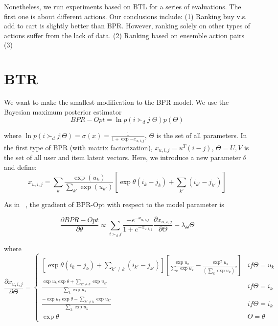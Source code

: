 \documentclass[11pt]{report}
\begin{document}
Nonetheless, we run experiments based on BTL for a series of evaluations. The first one is about different actions. Our conclusions include: (1) Ranking buy v.s. add to cart is slightly better than BPR. However,  ranking solely on other types of actions suffer from the lack of data. (2) Ranking based on ensemble action pairs (3) 

\section{BTR}
We want to make the smallest modification to the BPR model. We use the Bayesian maximum posterior estimator 
\begin{equation}
BPR-Opt = \ln p(i\succ_d j|\Theta) p(\Theta)
\end{equation}

where $\ln p(i\succ_d j|\Theta) =\sigma(x)=\frac{1}{1+\exp{-x_{u,i,j}}}$, $\Theta$ is the set of all parameters. In the first type of BPR (with matrix factorization), $x_{u,i,j}=u^T(i-j)$, $\Theta=U,V$ is the set of all user and item latent vectors. Here, we introduce a new parameter $\theta$ and define:
\begin{equation}
x_{u,i,j}=\sum_k \frac{\exp (u_k)}{\sum_{k'} \exp (u_{k'})}[\exp \theta(i_k-j_k)+\sum_{k'}(i_{k'}-j_{k'})]
\end{equation}


As in ~\cite{Rendle2009BPR},  the gradient of BPR-Opt with respect to the model parameter is

\begin{equation}
\frac{\partial BPR-Opt}{\partial \theta}\propto \sum_{i\succ_d j} \frac{-e^{-x_{u,i,j}}}{1+ e^{-x_{u,i,j}} } \frac{\partial x_{u,i,j}}{\partial \Theta} -\lambda_\Theta \Theta
\end{equation}

where 
\begin{equation}
 \frac{\partial x_{u,i,j}}{\partial \Theta}=\left\{\begin{matrix}
[\exp\theta (i_k-j_k)+\sum_{k'\neq k}(i_{k'}-j_{k'})][\frac{\exp u_k}{\sum_{k}\exp u_k}-\frac{\exp^2 u_k}{(\sum_k \exp u_k)^2}] & if \Theta=u_k \\ 
\frac{\exp u_k \exp \theta +\sum_{k'\neq k} \exp u_{k'}}{\sum_k \exp u_k}  & if \Theta= i_k \\ 
\frac{-\exp u_k \exp \theta -\sum_{k'\neq k} \exp u_{k'}}{\sum_k \exp u_k}  & if \Theta= i_k \\ 
\exp \theta & \Theta = \theta 
\end{matrix}\right.
\end{equation}
\end{document}
